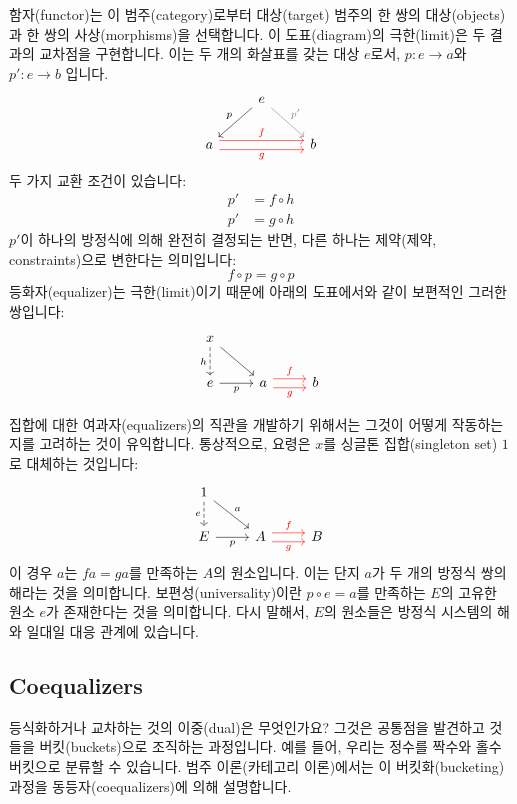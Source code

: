 \documentclass[DaoFP]{subfiles}
\begin{document}
함자(functor)는 이 범주(category)로부터 대상(target) 범주의 한 쌍의 대상(objects)과 한 쌍의 사상(morphisms)을 선택합니다. 이 도표(diagram)의 극한(limit)은 두 결과의 교차점을 구현합니다. 이는 두 개의 화살표를 갖는 대상 $e$로서, $p \colon e \to a$와 $p' \colon e \to b$ 입니다.
\[
\begin{tikzcd}
& e
\arrow[dl, "p"']
\arrow[dr, gray, "p'"]
\\
a 
\arrow[rr, red, shift left=.75ex, "f"]
\arrow[rr, red, shift right=.75ex, "g"']
&&
b
\end{tikzcd}
\]
두 가지 교환 조건이 있습니다:
\begin{align*}
p' &= f \circ h \\
p' &= g \circ h
\end{align*}
$p'$이 하나의 방정식에 의해 완전히 결정되는 반면, 다른 하나는 제약(제약, constraints)으로 변한다는 의미입니다:
\[ f \circ p = g \circ p \]
등화자(equalizer)는 극한(limit)이기 때문에 아래의 도표에서와 같이 보편적인 그러한 쌍입니다:
\[
\begin{tikzcd}
x
\arrow[d, dashed, "h"']
\arrow[dr, ""]
\\
e
\arrow[r, "p"']
&
a \arrow[r, red, shift left=0.75ex, "f"]
  \arrow[r, red, shift right=0.75ex, "g"']
&
b
\end{tikzcd}
\]

집합에 대한 여과자(equalizers)의 직관을 개발하기 위해서는 그것이 어떻게 작동하는지를 고려하는 것이 유익합니다. 통상적으로, 요령은 $x$를 싱글톤 집합(singleton set) $1$로 대체하는 것입니다:
\[
\begin{tikzcd}
1
\arrow[d, dashed, "e"']
\arrow[dr, "a"]
\\
E
\arrow[r, "p"']
&
A \arrow[r, red, shift left=0.75ex, "f"]
  \arrow[r, red, shift right=0.75ex, "g"']
&
B
\end{tikzcd}
\]
이 경우 $a$는 $f a = g a$를 만족하는 $A$의 원소입니다. 이는 단지 $a$가 두 개의 방정식 쌍의 해라는 것을 의미합니다. 보편성(universality)이란 $p \circ e = a$를 만족하는 $E$의 고유한 원소 $e$가 존재한다는 것을 의미합니다. 다시 말해서, $E$의 원소들은 방정식 시스템의 해와 일대일 대응 관계에 있습니다.

\subsection{Coequalizers}

등식화하거나 교차하는 것의 이중(dual)은 무엇인가요? 그것은 공통점을 발견하고 것들을 버킷(buckets)으로 조직하는 과정입니다. 예를 들어, 우리는 정수를 짝수와 홀수 버킷으로 분류할 수 있습니다. 범주 이론(카테고리 이론)에서는 이 버킷화(bucketing) 과정을 동등자(coequalizers)에 의해 설명합니다.
\end{document}
